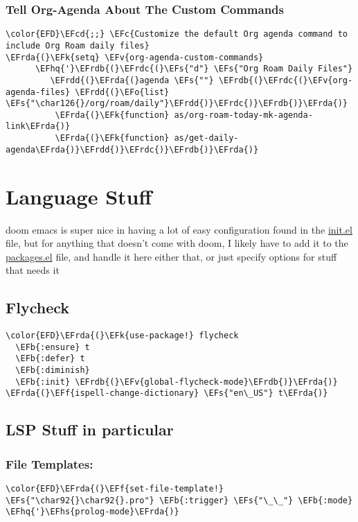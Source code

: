 \documentclass{article}
\newcommand{\EFc}[1]{\textcolor{EFc}{#1}} %
\newcommand{\EFcd}[1]{\textcolor{EFcd}{#1}} %
\newcommand{\EFs}[1]{\textcolor{EFs}{#1}} %
\newcommand{\EFk}[1]{\textcolor{EFk}{#1}} %
\newcommand{\EFb}[1]{\textcolor{EFb}{#1}} %
\newcommand{\EFf}[1]{\textcolor{EFf}{#1}} %
\newcommand{\EFv}[1]{\textcolor{EFv}{#1}} %
\newcommand{\EFo}[1]{\textcolor{EFo}{#1}} %
\newcommand{\EFhq}[1]{#1} %
\newcommand{\EFhs}[1]{\textcolor{EFhs}{#1}} %
\newcommand{\EFrda}[1]{\textcolor{EFrda}{#1}} %
\newcommand{\EFrdb}[1]{\textcolor{EFrdb}{#1}} %
\newcommand{\EFrdc}[1]{\textcolor{EFrdc}{#1}} %
\newcommand{\EFrdd}[1]{\textcolor{EFrdd}{#1}} %
\begin{document}
\subsubsection{Tell Org-Agenda About The Custom Commands}
\label{sec:org35e7899}
\begin{Code}
\begin{Verbatim}
\color{EFD}\EFcd{;;} \EFc{Customize the default Org agenda command to include Org Roam daily files}
\EFrda{(}\EFk{setq} \EFv{org-agenda-custom-commands}
      \EFhq{'}\EFrdb{(}\EFrdc{(}\EFs{"d"} \EFs{"Org Roam Daily Files"}
         \EFrdd{(}\EFrda{(}agenda \EFs{""} \EFrdb{(}\EFrdc{(}\EFv{org-agenda-files} \EFrdd{(}\EFo{list} \EFs{"\char126{}/org/roam/daily"}\EFrdd{)}\EFrdc{)}\EFrdb{)}\EFrda{)}
          \EFrda{(}\EFk{function} as/org-roam-today-mk-agenda-link\EFrda{)}
          \EFrda{(}\EFk{function} as/get-daily-agenda\EFrda{)}\EFrdd{)}\EFrdc{)}\EFrdb{)}\EFrda{)}
\end{Verbatim}
\end{Code}

\section{Language Stuff}
\label{sec:orge3f16c3}
doom emacs is super nice in having a lot of easy configuration found in the \href{file:///home/liam/.config/doom/ init.el}{init.el} file, but for anything that doesn't come with doom, I likely have to add it to the \href{file:///home/liam/.config/doom/packages.el}{packages.el} file, and handle it here
either that, or just specify options for stuff that needs it
\subsection{Flycheck}
\label{sec:org32c9c67}
\begin{Code}
\begin{Verbatim}
\color{EFD}\EFrda{(}\EFk{use-package!} flycheck
  \EFb{:ensure} t
  \EFb{:defer} t
  \EFb{:diminish}
  \EFb{:init} \EFrdb{(}\EFv{global-flycheck-mode}\EFrdb{)}\EFrda{)}
\EFrda{(}\EFf{ispell-change-dictionary} \EFs{"en\_US"} t\EFrda{)}
\end{Verbatim}
\end{Code}
\subsection{LSP Stuff in particular}
\label{sec:org4acb271}
\subsubsection{File Templates:}
\label{sec:org0e329fd}
\begin{Code}
\begin{Verbatim}
\color{EFD}\EFrda{(}\EFf{set-file-template!} \EFs{"\char92{}\char92{}.pro"} \EFb{:trigger} \EFs{"\_\_"} \EFb{:mode} \EFhq{'}\EFhs{prolog-mode}\EFrda{)}
\end{Verbatim}
\end{Code}
\end{document}
